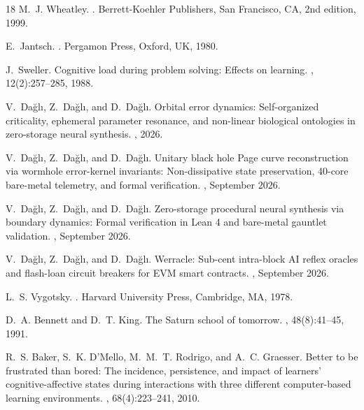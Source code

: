 \documentclass[10pt,twocolumn,a4paper]{article}
\begin{document}
\begin{thebibliography}{18}
M.~J. Wheatley.
.
\newblock Berrett-Koehler Publishers, San Francisco, CA, 2nd edition, 1999.

E.~Jantsch.
.
\newblock Pergamon Press, Oxford, UK, 1980.

J.~Sweller.
\newblock Cognitive load during problem solving: Effects on learning.
, 12(2):257--285, 1988.

V.~Da{\u{g}}l{\i}, Z.~Da{\u{g}}l{\i}, and D.~Da{\u{g}}l{\i}.
\newblock Orbital error dynamics: Self-organized criticality, ephemeral
  parameter resonance, and non-linear biological ontologies in zero-storage
  neural synthesis.
, 2026.

V.~Da{\u{g}}l{\i}, Z.~Da{\u{g}}l{\i}, and D.~Da{\u{g}}l{\i}.
\newblock Unitary black hole {Page} curve reconstruction via wormhole
  error-kernel invariants: Non-dissipative state preservation, 40-core
  bare-metal telemetry, and formal verification.
, September 2026.

V.~Da{\u{g}}l{\i}, Z.~Da{\u{g}}l{\i}, and D.~Da{\u{g}}l{\i}.
\newblock Zero-storage procedural neural synthesis via boundary dynamics:
  Formal verification in {Lean 4} and bare-metal gauntlet validation.
, September 2026.

V.~Da{\u{g}}l{\i}, Z.~Da{\u{g}}l{\i}, and D.~Da{\u{g}}l{\i}.
\newblock Werracle: Sub-cent intra-block {AI} reflex oracles and flash-loan
  circuit breakers for {EVM} smart contracts.
, September 2026.

L.~S. Vygotsky.
.
\newblock Harvard University Press, Cambridge, MA, 1978.

D.~A. Bennett and D.~T. King.
\newblock The {Saturn} school of tomorrow.
, 48(8):41--45, 1991.

R.~S. Baker, S.~K. D'Mello, M.~M.~T. Rodrigo, and A.~C. Graesser.
\newblock Better to be frustrated than bored: The incidence, persistence, and
  impact of learners' cognitive-affective states during interactions with three
  different computer-based learning environments.
,
  68(4):223--241, 2010.

\end{thebibliography}
\end{document}
